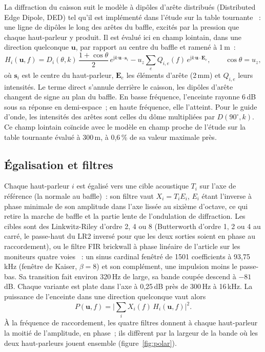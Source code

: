 \documentclass[11pt,a4paper]{article}
\newcommand{\vect}[1]{\mathbf{#1}}
\newcommand{\jj}{\mathrm{j}}
\begin{document}
La diffraction du caisson suit le modèle à dipôles d'arête distribués (Distributed Edge Dipole, DED)
\cite{urban2004} tel qu'il est implémenté dans l'étude sur la table tournante \cite{turntable2026}~: une
ligne de dipôles le long des arêtes du baffle, excités par la pression que chaque haut-parleur y
produit. Il est évalué ici en champ lointain, dans une direction quelconque $\vect u$, par rapport au
centre du baffle et ramené à 1\,m~:
\begin{equation}
H_i(\vect u, f) = D_i(\theta, k)\,\frac{1 + \cos\theta}{2}\,e^{\jj k\,\vect u\cdot\vect s_i}
 - u_z \sum_e Q_{i,e}(f)\,e^{\jj k\,\vect u\cdot\vect E_e},
\qquad \cos\theta = u_z,
\end{equation}
où $\vect s_i$ est le centre du haut-parleur, $\vect E_e$ les éléments d'arête (2\,mm) et $Q_{i,e}$ leurs
intensités. Le terme direct s'annule derrière le caisson, les dipôles d'arête changent de signe au plan
du baffle. En basse fréquence, l'enceinte rayonne 6\,dB sous sa réponse en demi-espace~; en haute
fréquence, elle l'atteint. Pour le guide d'onde, les intensités des arêtes sont celles du dôme
multipliées par $D(90^\circ, k)$. Ce champ lointain coïncide avec le modèle en champ proche de l'étude
sur la table tournante évalué à 300\,m, à 0,6\,\% de sa valeur maximale près.

\subsection{Égalisation et filtres}

Chaque haut-parleur $i$ est égalisé vers une cible acoustique $T_i$ sur l'axe de référence (la normale
au baffle)~: son filtre vaut $X_i = T_i E_i$, $E_i$ étant l'inverse à phase minimale de son amplitude dans
l'axe lissée au sixième d'octave, ce qui retire la marche de baffle et la partie lente de l'ondulation
de diffraction. Les cibles sont des Linkwitz-Riley d'ordre 2, 4 ou 8 (Butterworth d'ordre 1, 2 ou 4 au
carré, le passe-haut du LR2 inversé pour que les deux sorties soient en phase au raccordement), ou le
filtre FIR brickwall à phase linéaire de l'article sur les moniteurs quatre voies \cite{demion2026}~: un
sinus cardinal fenêtré de 1501 coefficients à 93,75\,kHz (fenêtre de Kaiser, $\beta = 8$) et son
complément, une impulsion moins le passe-bas. Sa transition fait environ 320\,Hz de large, sa bande
coupée descend à $-81$\,dB. Chaque variante est plate dans l'axe à 0,25\,dB près de 300\,Hz à 16\,kHz. La
puissance de l'enceinte dans une direction quelconque vaut alors
\begin{equation}
P(\vect u, f) = \Big|\sum_i X_i(f)\,H_i(\vect u, f)\Big|^2 .
\end{equation}
À la fréquence de raccordement, les quatre filtres donnent à chaque haut-parleur la moitié de
l'amplitude, en phase~; ils diffèrent par la largeur de la bande où les deux haut-parleurs jouent
ensemble (figure~\ref{fig:polar}).
\end{document}
